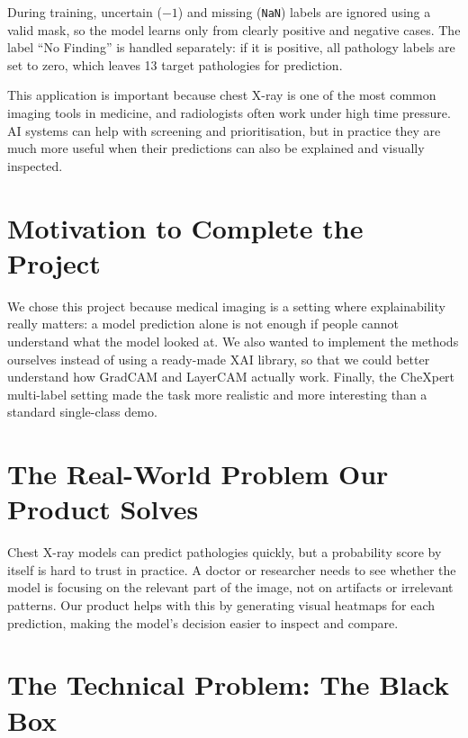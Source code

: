 \documentclass[12pt]{article}
\begin{document}
During training, uncertain ($-1$) and missing (\texttt{NaN}) labels are ignored using a valid mask, so the model learns only from clearly positive and negative cases. The label ``No Finding'' is handled separately: if it is positive, all pathology labels are set to zero, which leaves 13 target pathologies for prediction.

This application is important because chest X-ray is one of the most common imaging tools in medicine, and radiologists often work under high time pressure. AI systems can help with screening and prioritisation, but in practice they are much more useful when their predictions can also be explained and visually inspected.

\section{Motivation to Complete the Project}

We chose this project because medical imaging is a setting where explainability really matters: a model prediction alone is not enough if people cannot understand what the model looked at. We also wanted to implement the methods ourselves instead of using a ready-made XAI library, so that we could better understand how GradCAM and LayerCAM actually work. Finally, the CheXpert multi-label setting made the task more realistic and more interesting than a standard single-class demo.

\section{The Real-World Problem Our Product Solves}

Chest X-ray models can predict pathologies quickly, but a probability score by itself is hard to trust in practice. A doctor or researcher needs to see whether the model is focusing on the relevant part of the image, not on artifacts or irrelevant patterns. Our product helps with this by generating visual heatmaps for each prediction, making the model's decision easier to inspect and compare.

\section{The Technical Problem: The Black Box}
\end{document}
